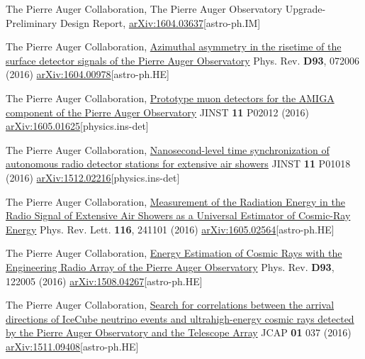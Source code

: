 \begin{etaremune}
\item {} The Pierre Auger Collaboration, {{The Pierre Auger Observatory Upgrade-Preliminary Design Report}}, \href{http://arxiv.org/abs/1604.03637}{arXiv:1604.03637}[astro-ph.IM]

\item {}The Pierre Auger Collaboration, \href{http://journals.aps.org/prd/abstract/10.1103/PhysRevD.93.072006}{{Azimuthal asymmetry in the risetime of the surface detector signals of the Pierre Auger Observatory}} Phys. Rev. {\bf D93}, 072006 (2016) \href{http://arxiv.org/abs/1604.00978}{arXiv:1604.00978}[astro-ph.HE]

\item {}The Pierre Auger Collaboration, \href{http://iopscience.iop.org/article/10.1088/1748-0221/11/02/P02012}{{Prototype muon detectors for the AMIGA component of the Pierre Auger Observatory}} JINST {\bf 11} P02012 (2016) \href{http://arxiv.org/abs/1605.01625}{arXiv:1605.01625}[physics.ins-det]

\item {}The Pierre Auger Collaboration, \href{http://iopscience.iop.org/article/10.1088/1748-0221/11/01/P01018}{{Nanosecond-level time synchronization of autonomous radio detector stations for extensive air showers}} JINST {\bf 11} P01018 (2016) \href{http://arxiv.org/abs/1512.02216}{arXiv:1512.02216}[physics.ins-det]

\item {}The Pierre Auger Collaboration, \href{http://journals.aps.org/prl/abstract/10.1103/PhysRevLett.116.241101}{{Measurement of the Radiation Energy in the Radio Signal of Extensive Air Showers as a Universal Estimator of Cosmic-Ray Energy}} Phys. Rev. Lett. {\bf 116}, 241101 (2016) \href{http://arxiv.org/abs/1605.02564}{arXiv:1605.02564}[astro-ph.HE]

\item {}The Pierre Auger Collaboration, \href{http://journals.aps.org/prd/abstract/10.1103/PhysRevD.93.122005}{{Energy Estimation of Cosmic Rays with the Engineering Radio Array of the Pierre Auger Observatory}} Phys. Rev. {\bf D93}, 122005 (2016) \href{http://arxiv.org/abs/1508.04267}{arXiv:1508.04267}[astro-ph.HE]

\item {}The Pierre Auger Collaboration, \href{http://dx.doi.org/10.1088/1475-7516/2016/01/037}{{Search for correlations between the arrival directions of IceCube neutrino events and ultrahigh-energy cosmic rays detected by the Pierre Auger Observatory and the Telescope Array}} JCAP {\bf{01}} 037 (2016) \href{http://arxiv.org/abs/1511.09408}{arXiv:1511.09408}[astro-ph.HE]


\end{etaremune}
